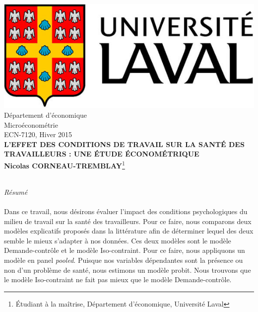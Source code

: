 \documentclass[a4paper, oneside, titlepage]{article}
\begin{document}
\begin{titlepage}
\begin{center}

\includegraphics[scale=0.8]{UL}
\\[1.5cm]

{\large Département d'économique \\
Microéconométrie \\
ECN-7120, Hiver 2015
}
\\[3cm]
\textbf{L'EFFET DES CONDITIONS DE TRAVAIL SUR LA SANTÉ DES TRAVAILLEURS : UNE ÉTUDE ÉCONOMÉTRIQUE}
\\[2cm]
\textbf{Nicolas CORNEAU-TREMBLAY}\footnote{Étudiant à la maîtrise, Département d'économique, Université Laval}
\\[3cm]
\\[6cm]
\end{center}
\end{titlepage}

\newpage
\textit{Résumé} 
\\
\\
Dans ce travail, nous désirons évaluer l'impact des conditions psychologiques du milieu de travail sur la santé des travailleurs. Pour ce faire, nous comparons deux modèles explicatifs proposés dans la littérature afin de déterminer lequel des deux semble le mieux s'adapter à nos données. Ces deux modèles sont le modèle Demande-contrôle et le modèle Iso-contraint. Pour ce faire, nous appliquons un modèle en panel \textit{pooled}. Puisque nos variables dépendantes sont la présence ou non d'un problème de santé, nous estimons un modèle probit. Nous trouvons que le modèle Iso-contraint ne fait pas mieux que le modèle Demande-contrôle.

\newpage
\tableofcontents
\newpage
\listoftables 

\newpage
\end{document}

